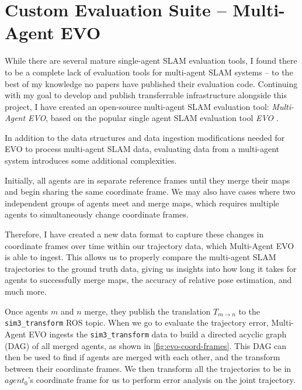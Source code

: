 \section{Custom Evaluation Suite – Multi-Agent EVO}
\label{sec:multi-agent-evo}
While there are several mature single-agent SLAM evaluation tools, I found there to be a complete lack of evaluation tools for multi-agent SLAM systems – to the best of my knowledge no papers have published their evaluation code. Continuing with my goal to develop and publish transferrable infrastructure alongside this project, I have created an open-source multi-agent SLAM evaluation tool: \textit{Multi-Agent EVO}, based on the popular single agent SLAM evaluation tool \textit{EVO} \autocite{grupp2017evo}.

In addition to the data structures and data ingestion modifications needed for EVO to process multi-agent SLAM data, evaluating data from a multi-agent system introduces some additional complexities.

Initially, all agents are in separate reference frames until they merge their maps and begin sharing the same coordinate frame. We may also have cases where two independent groups of agents meet and merge maps, which requires multiple agents to simultaneously change coordinate frames.

Therefore, I have created a new data format to capture these changes in coordinate frames over time within our trajectory data, which Multi-Agent EVO is able to ingest. This allows us to properly compare the multi-agent SLAM trajectories to the ground truth data, giving us insights into how long it takes for agents to successfully merge maps, the accuracy of relative pose estimation, and much more.

Once agents $m$ and $n$ merge, they publish the translation $T_{m \to n}$ to the \texttt{sim3\_transform} ROS topic. When we go to evaluate the trajectory error, Multi-Agent EVO ingests the \texttt{sim3\_transform} data to build a directed acyclic graph (DAG) of all merged agents, as shown in \autoref{fig:evo-coord-frames}. This DAG can then be used to find if agents are merged with each other, and the transform between their coordinate frames. We then transform all the trajectories to be in $agent_0$'s coordinate frame for us to perform error analysis on the joint trajectory.

